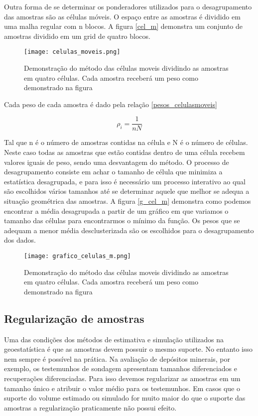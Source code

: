   Outra forma de se determinar os ponderadores utilizados para o desagrupamento das amostras são as células móveis. O espaço entre as amostras é dividido em uma malha regular com n blocos. A figura \eqref{cel_m} demonstra um conjunto de amostras dividido em um grid de quatro blocos.
  
   \begin{figure}[H]
   	\centering
   	\texttt{[image: celulas\_moveis.png]}	
   	\caption{Demonstração do método das células moveis dividindo as amostras em quatro células. Cada amostra receberá um peso como demonstrado na figura}
   	\label{cel_m}
   \end{figure}
  
  
  Cada peso de cada amostra é dado pela relação \eqref{pesos_celulasmoveis}
  
   \begin{equation}\label{pesos_celulasmoveis}
   \rho _{i} = \frac{1}{nN}
   \end{equation}
 
 Tal que n é o número de amostras contidas na célula e N é o número de células. Neste caso todas as amostras que estão contidas dentro de uma célula recebem valores iguais de peso, sendo uma desvantagem do método. O processo de desagrupamento consiste em achar o tamanho de célula que minimiza a estatística desagrupada, e para isso é necessário um processo interativo ao qual são escolhidos vários tamanhos até se determinar aquele que melhor se adequa a situação geométrica das amostras. A figura \eqref{g_cel_m} demonstra como podemos encontrar a média desagrupada a partir de um gráfico em que variamos o tamanho das células para encontrarmos o mínimo da função. Os pesos que se adequam a menor média desclusterizada são os escolhidos para o desagrupamento dos dados.
 
 
\begin{figure}[H]
	\centering
	\texttt{[image: grafico\_celulas\_m.png]}	
	\caption{Demonstração do método das células moveis dividindo as amostras em quatro células. Cada amostra receberá um peso como demonstrado na figura}
	\label{g_cel_m}
\end{figure}
 
\subsection{Regularização de amostras }

Uma das condições dos métodos de estimativa e simulação utilizados na geoestatística é que as amostras devem possuir o mesmo suporte. No entanto isso nem sempre é possível na prática. Na avaliação de depósitos minerais, por exemplo, os testemunhos de sondagem apresentam tamanhos diferenciados e recuperações diferenciadas. Para isso devemos regularizar as amostras em um tamanho único e atribuir o valor médio para os testemunhos. Em casos que o suporte do volume estimado ou simulado for muito maior do que o suporte das amostras a regularização praticamente não possui efeito.

